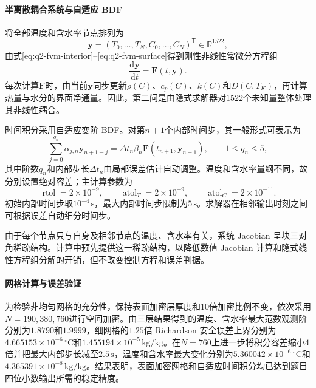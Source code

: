 \documentclass[withoutpreface,bwprint]{cumcmthesis}
\begin{document}
\paragraph{半离散耦合系统与自适应 BDF}
将全部温度和含水率节点排列为
\begin{equation}
\boldsymbol y
=
\left(
T_0,\ldots,T_N,
C_0,\ldots,C_N
\right)^{\mathsf T}
\in\mathbb R^{1522},
\label{eq:q2-state-vector}
\end{equation}
由式\eqref{eq:q2-fvm-interior}--\eqref{eq:q2-fvm-surface}得到刚性非线性常微分方程组
\begin{equation}
\frac{\mathrm d\boldsymbol y}{\mathrm dt}
=
\boldsymbol F(t,\boldsymbol y).
\label{eq:q2-semidiscrete-system}
\end{equation}
每次计算$\boldsymbol F$时，由当前$\boldsymbol y$同步更新$\rho(C)$、$c_p(C)$、$k(C)$和$D(C,T_K)$，再计算热量与水分的界面净通量。因此，第二问是由隐式求解器对$1522$个未知量整体处理其非线性耦合。

时间积分采用自适应变阶 BDF。对第$n+1$个内部时间步，其一般形式可表示为
\begin{equation}
\sum_{j=0}^{q_n}
\alpha_{j,n}\boldsymbol y_{n+1-j}
=
\Delta t_n\beta_n
\boldsymbol F(t_{n+1},\boldsymbol y_{n+1}),
\qquad
1\le q_n\le5,
\label{eq:q2-adaptive-bdf}
\end{equation}
其中阶数$q_n$和内部步长$\Delta t_n$由局部误差估计自动调整。温度和含水率量纲不同，故分别设置绝对容差；主计算参数为
\begin{equation}
\operatorname{rtol}=2\times10^{-9},
\qquad
\operatorname{atol}_T=2\times10^{-9},
\qquad
\operatorname{atol}_C=2\times10^{-11}.
\label{eq:q2-bdf-tolerances}
\end{equation}
初始内部时间步取$10^{-4}\,\mathrm{s}$，最大内部时间步限制为$5\,\mathrm{s}$。求解器在相邻输出时刻之间可根据误差自动细分时间步。

由于每个节点只与自身及相邻节点的温度、含水率有关，系统 Jacobian 呈块三对角稀疏结构。计算中预先提供这一稀疏结构，以降低数值 Jacobian 计算和隐式线性方程组分解的开销，但不改变控制方程和误差判据。

\paragraph{网格计算与误差验证}
为检验非均匀网格的充分性，保持表面加密层厚度和$10$倍加密比例不变，依次采用$N=190,380,760$进行空间加密。由三层结果得到的温度、含水率最大范数观测阶分别为$1.8790$和$1.9999$，细网格的$1.25$倍 Richardson 安全误差上界分别为$4.665153\times10^{-6}\,{}^\circ\mathrm C$和$1.455194\times10^{-5}\,\mathrm{kg/kg}$。在$N=760$上进一步将积分容差缩小$4$倍并把最大内部步长减至$2.5\,\mathrm{s}$，温度和含水率最大变化分别为$5.360042\times10^{-6}\,{}^\circ\mathrm C$和$4.365391\times10^{-8}\,\mathrm{kg/kg}$。结果表明，表面加密网格和自适应时间积分均已达到题目四位小数输出所需的稳定精度。
\end{document}
